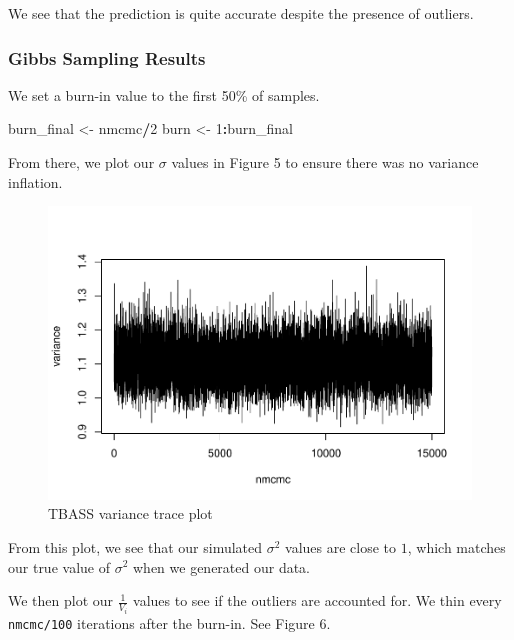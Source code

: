 \documentclass[
]{article}
\newenvironment{Shaded}{\begin{snugshade}}{\end{snugshade}}
\newcommand{\DecValTok}[1]{\textcolor[rgb]{0.00,0.00,0.81}{#1}}
\newcommand{\NormalTok}[1]{#1}
\newcommand{\OperatorTok}[1]{\textcolor[rgb]{0.81,0.36,0.00}{\textbf{#1}}}
\newcommand{\StringTok}[1]{\textcolor[rgb]{0.31,0.60,0.02}{#1}}
\begin{document}
We see that the prediction is quite accurate despite the presence of
outliers.

\hypertarget{gibbs-sampling-results}{%
\subsubsection{Gibbs Sampling Results}\label{gibbs-sampling-results}}

We set a burn-in value to the first 50\% of samples.

\begin{Shaded}
\begin{Highlighting}[]
\NormalTok{burn_final <-}\StringTok{ }\NormalTok{nmcmc}\OperatorTok{/}\DecValTok{2}
\NormalTok{burn <-}\StringTok{ }\DecValTok{1}\OperatorTok{:}\NormalTok{burn_final}
\end{Highlighting}
\end{Shaded}

From there, we plot our \(\sigma\) values in Figure 5 to ensure there
was no variance inflation.

\begin{figure}
\centering
\includegraphics{TBASS_vig_files/figure-latex/unnamed-chunk-14-1.pdf}
\caption{TBASS variance trace plot}
\end{figure}

From this plot, we see that our simulated \(\sigma^2\) values are close
to \(1\), which matches our true value of \(\sigma^2\) when we generated
our data.

We then plot our \(\frac{1}{V_i}\) values to see if the outliers are
accounted for. We thin every \texttt{nmcmc/100} iterations after the
burn-in. See Figure 6.
\end{document}
